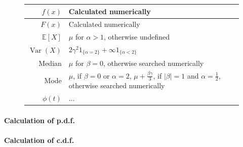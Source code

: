 \documentclass[a4paper,11pt]{article}
\theoremstyle{plain}
\theoremstyle{definition}
\newcommand{\ME}{\mathbb{E}}
\newcommand{\Var}{\operatorname{Var}}
\begin{document}
\begin{figure}[!htb]
\begin{minipage}{0.4\textwidth}
\begin{tabular}{| r | l |}
			\hline
			$f(x)$ & Calculated numerically \\
			\hline
			$F(x)$ & Calculated numerically \\
			\hline
			$\ME[X]$ & \pbox{\linewidth}{$ \mu$ for $\alpha > 1$,\\ otherwise undefined} \\
			\hline
			$\Var(X)$ & $2 \gamma^2 1_{\{ \alpha = 2 \} } + \infty 1_{ \{ \alpha < 2 \} }  $ \\
			\hline
			Median & \pbox{\linewidth}{$\mu$ for $\beta = 0$,\\ otherwise searched numerically} \\
			\hline
			Mode & \pbox{\linewidth}{$\mu$, if $\beta = 0$ or $\alpha = 2$, \\  $\mu + \frac{\beta \gamma}{3}$, if $|\beta| = 1$ and $\alpha = \frac{1}{2}$, \\ otherwise searched numerically} \\
			\hline
			$\phi(t)$ & $ ...$ \\
			\hline
		\end{tabular}
	    \end{minipage}
	\end{figure}
	
	\paragraph{Calculation of p.d.f.}
	\paragraph{Calculation of c.d.f.}
\end{document}
